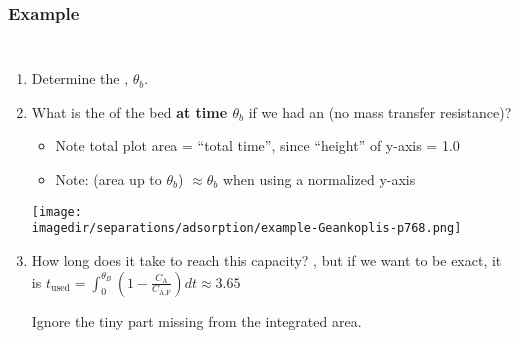 \begin{frame}\frametitle{Example}
	\vspace{-12pt}
	\begin{columns}[t]
		\begin{enumerate}
			\item	Determine the {\color{purple}{breakthrough time}}, $\theta_b$. \pause \iftoggle{instructor}{[{\color{myOrange}{\small Ans: 3.65 hours}}]}{}
			\item	What is the {\color{purple}{usable capacity}} of the bed \textbf{at time $\theta_b$} if we had an {\color{purple}{ideal wavefront}} (no mass transfer resistance)? \pause \iftoggle{instructor}{[{\color{myOrange}{Ans:}} the fractional area of $A_1$ = 3.65 / 6.9 = {\color{orange}{53\%}}]}{}
			\pause
				\begin{itemize}
					\item	Note total plot area = ``total time'', since ``height'' of y-axis = 1.0
					\item	Note: (area up to $\theta_b$) $\approx \theta_b$  when using a normalized y-axis
				\end{itemize}
			\begin{center}
				\texttt{[image: \\imagedir/separations/adsorption/example-Geankoplis-p768.png]}
			\end{center}
			\vspace{-6pt}
			\item	How long does it take to reach this capacity? {}, but if we want to be exact, it is $t_\text{used} = \displaystyle \int_0^{\theta_B}{\left(1-\frac{C_\text{A}}{C_\text{A,F}} \right)dt} \approx 3.65$

			\vspace{-4pt}
			{\tiny Ignore the tiny part missing from the integrated area.}
		\end{enumerate}
	\end{columns}
\end{frame}

